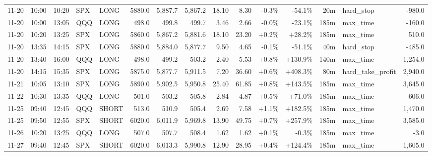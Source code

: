 \documentclass[11pt,a4paper,twoside]{article}
\begin{document}
\begin{landscape}
\begin{center}
\begin{longtable}{>{\color{txtmain}}l l l l l r r r r r r r r >{\color{txtmain}}l r}
11-20 & 10:00 & 10:20 & SPX & LONG & 5880.0 & 5,887.7 & 5,867.2 & 18.10 & 8.30 & \textcolor{lossred}{-0.3\%} & \textcolor{lossred}{-54.1\%} & 20m & hard\_stop & \textcolor{lossred}{-980.0} \\
11-20 & 10:00 & 13:05 & QQQ & LONG & 498.0 & 499.8 & 499.7 & 3.46 & 2.66 & \textcolor{lossred}{-0.0\%} & \textcolor{lossred}{-23.1\%} & 185m & max\_time & \textcolor{lossred}{-160.0} \\
11-20 & 10:20 & 13:25 & SPX & LONG & 5860.0 & 5,867.2 & 5,881.6 & 18.10 & 23.20 & \textcolor{wingreen}{+0.2\%} & \textcolor{wingreen}{+28.2\%} & 185m & max\_time & \textcolor{wingreen}{510.0} \\
11-20 & 13:35 & 14:15 & SPX & LONG & 5880.0 & 5,884.0 & 5,877.7 & 9.50 & 4.65 & \textcolor{lossred}{-0.1\%} & \textcolor{lossred}{-51.1\%} & 40m & hard\_stop & \textcolor{lossred}{-485.0} \\
11-20 & 13:40 & 16:00 & QQQ & LONG & 498.0 & 499.2 & 503.2 & 2.40 & 5.53 & \textcolor{wingreen}{+0.8\%} & \textcolor{wingreen}{+130.9\%} & 140m & max\_time & \textcolor{wingreen}{1,254.0} \\
11-20 & 14:15 & 15:35 & SPX & LONG & 5875.0 & 5,877.7 & 5,911.5 & 7.20 & 36.60 & \textcolor{wingreen}{+0.6\%} & \textcolor{wingreen}{+408.3\%} & 80m & hard\_take\_profit & \textcolor{wingreen}{2,940.0} \\
11-21 & 10:05 & 13:10 & SPX & LONG & 5890.0 & 5,902.5 & 5,950.8 & 25.40 & 61.85 & \textcolor{wingreen}{+0.8\%} & \textcolor{wingreen}{+143.5\%} & 185m & max\_time & \textcolor{wingreen}{3,645.0} \\
11-22 & 10:30 & 13:35 & QQQ & LONG & 501.0 & 503.2 & 505.8 & 2.84 & 4.87 & \textcolor{wingreen}{+0.5\%} & \textcolor{wingreen}{+71.0\%} & 185m & max\_time & \textcolor{wingreen}{606.0} \\
11-25 & 09:40 & 12:45 & QQQ & SHORT & 513.0 & 510.9 & 505.4 & 2.69 & 7.58 & \textcolor{wingreen}{+1.1\%} & \textcolor{wingreen}{+182.5\%} & 185m & max\_time & \textcolor{wingreen}{1,470.0} \\
11-25 & 09:50 & 12:55 & SPX & SHORT & 6020.0 & 6,011.9 & 5,969.8 & 13.90 & 49.75 & \textcolor{wingreen}{+0.7\%} & \textcolor{wingreen}{+257.9\%} & 185m & max\_time & \textcolor{wingreen}{3,585.0} \\
11-26 & 10:20 & 13:25 & QQQ & LONG & 507.0 & 507.7 & 508.4 & 1.62 & 1.62 & \textcolor{wingreen}{+0.1\%} & \textcolor{lossred}{-0.3\%} & 185m & max\_time & \textcolor{lossred}{-3.0} \\
11-27 & 09:40 & 12:45 & SPX & SHORT & 6020.0 & 6,013.3 & 5,990.8 & 12.90 & 28.95 & \textcolor{wingreen}{+0.4\%} & \textcolor{wingreen}{+124.4\%} & 185m & max\_time & \textcolor{wingreen}{1,605.0} \\

\end{longtable}
\end{center}
\end{landscape}
\end{document}
